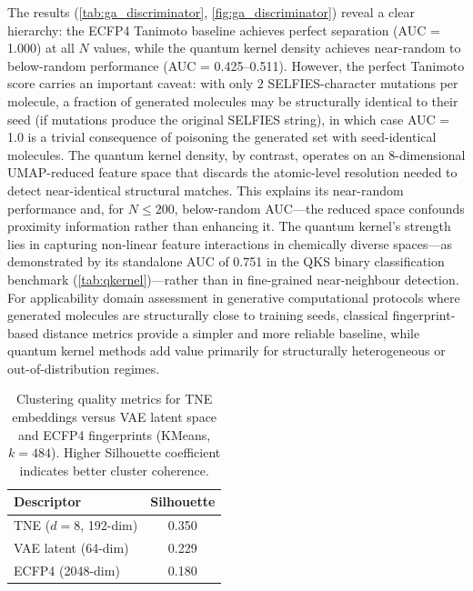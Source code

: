 \documentclass[11pt,a4paper]{article}
\begin{document}
The results (\cref{tab:ga_discriminator}, \cref{fig:ga_discriminator}) reveal a clear hierarchy: the ECFP4 Tanimoto baseline achieves perfect separation (AUC = \num{1.000}) at all $N$ values, while the quantum kernel density achieves near-random to below-random performance (AUC = \numrange{0.425}{0.511}). However, the perfect Tanimoto score carries an important caveat: with only $2$ SELFIES-character mutations per molecule, a fraction of generated molecules may be structurally identical to their seed (if mutations produce the original SELFIES string), in which case AUC = \num{1.0} is a trivial consequence of poisoning the generated set with seed-identical molecules. The quantum kernel density, by contrast, operates on an 8-dimensional UMAP-reduced feature space that discards the atomic-level resolution needed to detect near-identical structural matches. This explains its near-random performance and, for $N \leq 200$, below-random AUC---the reduced space 
confounds proximity information rather than enhancing it. The quantum kernel's strength lies in capturing non-linear feature interactions in chemically 
diverse spaces---as demonstrated by its standalone AUC of \num{0.751} in the QKS binary classification benchmark (\cref{tab:qkernel})---rather than 
in fine-grained near-neighbour detection. For applicability domain assessment in generative computational protocols where generated molecules are structurally close to training seeds, classical fingerprint-based distance metrics provide a simpler and more reliable baseline, while quantum kernel methods add value primarily for structurally heterogeneous or out-of-distribution regimes.

\begin{table}[htbp]
\centering
\caption{Clustering quality metrics for TNE embeddings versus VAE latent space and ECFP4 fingerprints (KMeans, $k = 484$). Higher Silhouette coefficient indicates better cluster coherence.}
\label{tab:clustering}
\begin{tabularx}{\textwidth}{l S[table-format=1.3]}
\toprule
Descriptor & {Silhouette} \\
\midrule
TNE ($d=8$, \num{192}-dim) & 0.350 \\
VAE latent (\num{64}-dim) & 0.229 \\
ECFP4 (\num{2048}-dim) & 0.180 \\
\bottomrule
\end{tabularx}
\end{table}
\end{document}

